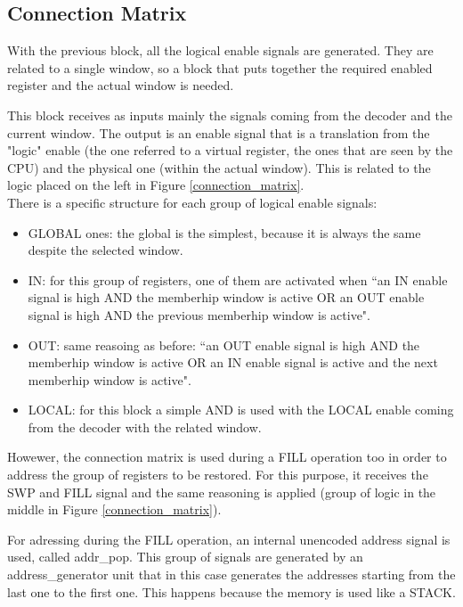 \subsection{Connection Matrix}

With the previous block, all the logical enable signals are generated. They are related to a single window, so a block that puts together the required enabled register and the actual window is needed. 

This block receives as inputs mainly the signals coming from the decoder and the current window. The output is an enable signal that is a translation from the "logic" enable (the one referred to a virtual register, the ones that are seen by the CPU) and the physical one (within the actual window). This is related to the logic placed on the left in Figure \ref{connection_matrix}.\\

There is a specific structure for each group of logical enable signals:
\begin{itemize}
  \item GLOBAL ones: the global is the simplest, because it is always the same despite the selected window.
  \item IN: for this group of registers, one of them are activated when ``an IN enable signal is high AND the memberhip window is active OR an OUT enable signal is high AND the previous memberhip window is active".
  \item OUT: same reasoing as before: ``an OUT enable signal is high AND the memberhip window is active OR an IN enable signal is active and the next memberhip window is active".
  \item LOCAL: for this block a simple AND is used with the LOCAL enable coming from the decoder with the related window. 
\end{itemize}

Howewer, the connection matrix is used during a FILL operation too in order to address the group of registers to be restored. For this purpose, it receives the SWP and FILL signal and the same reasoning is applied (group of logic in the middle in Figure \ref{connection_matrix}).

For adressing during the FILL operation, an internal unencoded address signal is used, called addr\_pop. This group of signals are generated by an address\_generator unit that in this case generates the addresses starting from the last one to the first one. This happens because the memory is used like a STACK.\\

